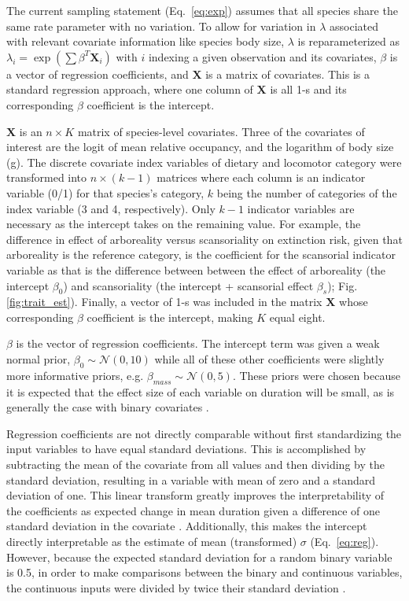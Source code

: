 The current sampling statement (Eq.~\ref{eq:exp}) assumes that all species share the same rate parameter with no variation. To allow for variation in \(\lambda\) associated with relevant covariate information like species body size, \(\lambda\) is reparameterized as \(\lambda_{i} = \exp(\sum \beta^{T}\mathbf{X}_{i})\) with \(i\) indexing a given observation and its covariates, \(\beta\) is a vector of regression coefficients, and \(\mathbf{X}\) is a matrix of covariates. This is a standard regression approach, where one column of \(\mathbf{X}\) is all 1-s and its corresponding \(\beta\) coefficient is the intercept. 

\(\mathbf{X}\) is an \(n \times K\) matrix of species-level covariates. Three of the covariates of interest are the logit of mean relative occupancy, and the logarithm of body size (g). The discrete covariate index variables of dietary and locomotor category were transformed into \(n \times (k - 1)\) matrices where each column is an indicator variable (0/1) for that species's category, \(k\) being the number of categories of the index variable (3 and 4, respectively). Only \(k - 1\) indicator variables are necessary as the intercept takes on the remaining value. For example, the difference in effect of arboreality versus scansoriality on extinction risk, given that arboreality is the reference category, is the coefficient for the scansorial indicator variable as that is the difference between between the effect of arboreality (the intercept \(\beta_{0}\)) and scansoriality (the intercept + scansorial effect \(\beta_{s}\)); Fig. \ref{fig:trait_est}). Finally, a vector of 1-s was included in the matrix \(\mathbf{X}\) whose corresponding \(\beta\) coefficient is the intercept, making \(K\) equal eight.

\(\beta\) is the vector of regression coefficients. The intercept term was given a weak normal prior, \(\beta_{0} \sim \mathcal{N}(0, 10)\) while all of these other coefficients were slightly more informative priors, e.g. \(\beta_{mass} \sim \mathcal{N}(0, 5)\). These priors were chosen because it is expected that the effect size of each variable on duration will be small, as is generally the case with binary covariates \cite{Gelman2007}.

Regression coefficients are not directly comparable without first standardizing the input variables to have equal standard deviations. This is accomplished by subtracting the mean of the covariate from all values and then dividing by the standard deviation, resulting in a variable with mean of zero and a standard deviation of one. This linear transform greatly improves the interpretability of the coefficients as expected change in mean duration given a difference of one standard deviation in the covariate \cite{Schielzeth2010}. Additionally, this makes the intercept directly interpretable as the estimate of mean (transformed) \(\sigma\) (Eq.~\ref{eq:reg}). However, because the expected standard deviation for a random binary variable is 0.5, in order to make comparisons between the binary and continuous variables, the continuous inputs were divided by twice their standard deviation \cite{Gelman2008}. 

